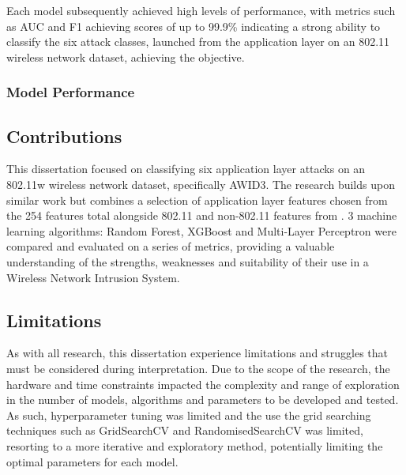 Each model subsequently achieved high levels of performance, with metrics such as AUC and F1 achieving scores of up to 99.9\% indicating a strong ability to classify the six attack classes, launched from the application layer on an 802.11 wireless network dataset, achieving the objective.

\subsubsection*{Model Performance}

\subsection{Contributions}


This dissertation focused on classifying six application layer attacks on an 802.11w wireless network dataset, specifically AWID3. The research builds upon similar work but combines a selection of application layer features chosen from the 254 features total alongside 802.11 and non-802.11 features from \parencite{s22155633}. 3 machine learning algorithms: Random Forest, XGBoost and Multi-Layer Perceptron were compared and evaluated on a series of metrics, providing a valuable understanding of the strengths, weaknesses and suitability of their use in a Wireless Network Intrusion System. 

\subsection{Limitations}


As with all research, this dissertation experience limitations and struggles that must be considered during interpretation. Due to the scope of the research, the hardware and time constraints impacted the complexity and range of exploration in the number of models, algorithms and parameters to be developed and tested. As such, hyperparameter tuning was limited and the use the grid searching techniques such as GridSearchCV and RandomisedSearchCV was limited, resorting to a more iterative and exploratory method, potentially limiting the optimal parameters for each model.

